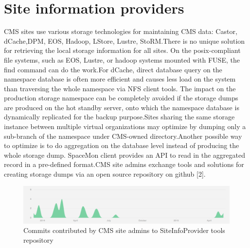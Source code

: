 \section {Site information providers}


CMS sites use various storage technologies for maintaining CMS data: Castor, dCache,DPM, EOS, Hadoop, LStore, Lustre, StoRM.There is no unique solution for retrieving the local storage information for all sites. On the posix-compliant file systems, such as EOS, Lustre, or hadoop systems mounted with FUSE, the find command can do the work.For dCache, direct database query on the namespace database is often more efficient and causes less load on the system than traversing the whole namespace via NFS client tools. The impact on the production storage namespace can be completely avoided if the storage dumps are produced on the hot standby server, onto which the namespace database is dynamically replicated for the backup purpose.Sites sharing the same storage instance between multiple virtual organizations may optimize by dumping only a sub-branch of the namespace under CMS-owned directory.Another possible way to optimize is to do aggregation on the database level instead of producing the whole storage dump. SpaceMon client provides an API to read in the aggregated record in a pre-defined format.CMS site admins exchange tools and solutions for creating storage dumps via an open source repository on github [2]. 

\begin{figure}[h]
\center
\includegraphics[width=1.0\linewidth]
{pictures/sites_contributions.pdf}
\caption{Commits contributed by CMS site admins to SiteInfoProvider tools repository}
\label{fig:github_stats}
\end{figure}

